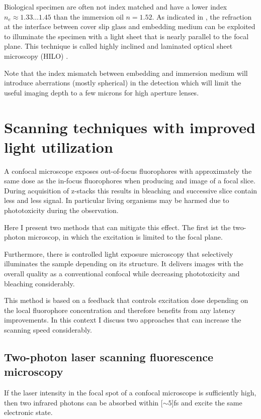 
Biological specimen are often not index matched and have a lower index
$n_e\approx 1.33\ldots1.45$ than the immersion oil $n=1.52$. As
indicated in , the refraction at the interface
between cover slip glass and embedding medium can be exploited to
illuminate the specimen with a light sheet that is nearly parallel to
the focal plane.  This technique is called highly inclined and
laminated optical sheet microscopy (HILO) \citep{Tokunaga2008,
  Konopka2008}.


Note that the index mismatch between embedding and immersion medium
will introduce aberrations (mostly spherical) in the detection which
will limit the useful imaging depth to a few microns for high aperture
lenses.
\section{Scanning techniques with improved light utilization}
\begin{summary}
  A confocal microscope exposes out-of-focus fluorophores with
  approximately the same dose as the in-focus fluorophores when
  producing and image of a focal slice. During acquisition of z-stacks
  this results in bleaching and successive slice contain less and less
  signal. In particular living organisms may be harmed due to
  phototoxicity during the observation.

  Here I present two methods that can mitigate this effect. The first
  ist the two-photon microscop, in which the excitation is limited to
  the focal plane.

  Furthermore, there is controlled light exposure microscopy that
  selectively illuminates the sample depending on its structure. It
  delivers images with the overall quality as a conventional confocal
  while decreasing phototoxicity and bleaching considerably.

  This method is based on a feedback that controls excitation dose
  depending on the local fluorophore concentration and therefore
  benefits from any latency improvements. In this context I discuss
  two approaches that can increase the scanning speed considerably.
\end{summary}
\subsection{Two-photon laser scanning fluorescence microscopy}
\label{sec:2-photon}
If the laser intensity in the focal spot of a confocal microscope is
sufficiently high, then two infrared photons can be absorbed within
\unit[$\sim 5$]{fs} and excite the same electronic state.

